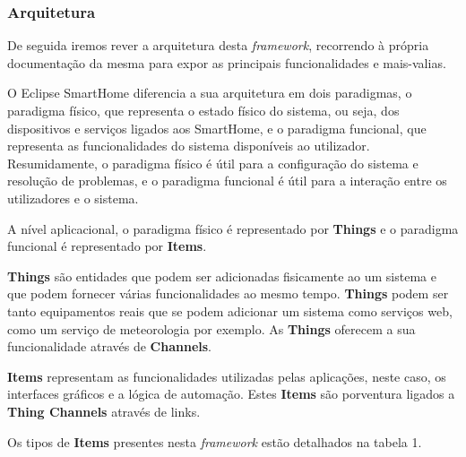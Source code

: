 \subsubsection{Arquitetura}

De seguida iremos rever a arquitetura desta \textit{framework}, recorrendo à própria documentação da mesma \cite{eclipse-smarthome-docs} para expor as principais funcionalidades e mais-valias.

O Eclipse SmartHome diferencia a sua arquitetura em dois paradigmas, o paradigma físico, que representa o estado físico do sistema, ou seja, dos dispositivos e serviços ligados aos SmartHome, e o paradigma funcional, que representa as funcionalidades do sistema disponíveis ao utilizador. Resumidamente, o paradigma físico é útil para a configuração do sistema e resolução de problemas, e o paradigma funcional é útil para a interação entre os utilizadores e o sistema.

A nível aplicacional, o paradigma físico é representado por \textbf{Things} e o paradigma funcional é representado por \textbf{Items}.

\textbf{Things} são entidades que podem ser adicionadas fisicamente ao um sistema e que podem fornecer várias funcionalidades ao mesmo tempo. \textbf{Things} podem ser tanto equipamentos reais que se podem adicionar um sistema como serviços web, como um serviço de meteorologia por exemplo. As \textbf{Things} oferecem a sua funcionalidade através de \textbf{Channels}.

\textbf{Items} representam as funcionalidades utilizadas pelas aplicações, neste caso, os interfaces gráficos e a lógica de automação. Estes \textbf{Items} são porventura ligados a \textbf{Thing Channels}  através de links.

Os tipos de \textbf{Items} presentes nesta \textit{framework} estão detalhados na tabela 1.

